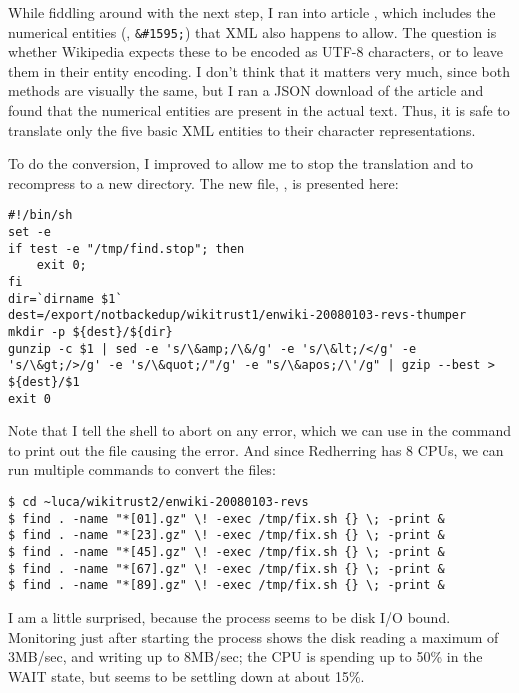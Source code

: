 While fiddling around with the next step, I ran into
article , which includes the numerical
entities (\eg, \texttt{\&\#1595;}) that XML also happens to allow.
The question is whether Wikipedia expects these to be
encoded as UTF-8 characters, or to leave them in their
entity encoding.
I don't think that it matters very much, since both methods
are visually the same, but I ran a JSON download of the
 article and found that the numerical entities
are present in the actual text.
Thus, it is safe to translate only the five basic XML entities
to their character representations.

To do the conversion, I improved  to allow
me to stop the translation and to recompress to a new directory.
The new file, , is presented here:
\begin{verbatim}
#!/bin/sh
set -e
if test -e "/tmp/find.stop"; then
    exit 0;
fi
dir=`dirname $1`
dest=/export/notbackedup/wikitrust1/enwiki-20080103-revs-thumper
mkdir -p ${dest}/${dir}
gunzip -c $1 | sed -e 's/\&amp;/\&/g' -e 's/\&lt;/</g' -e 's/\&gt;/>/g' -e 's/\&quot;/"/g' -e "s/\&apos;/\'/g" | gzip --best > ${dest}/$1
exit 0
\end{verbatim}
Note that I tell the shell to abort on any error, which we
can use in the  command to print out the file
causing the error.
And since Redherring has 8 CPUs, we can run multiple 
commands to convert the files:
\begin{verbatim}
$ cd ~luca/wikitrust2/enwiki-20080103-revs
$ find . -name "*[01].gz" \! -exec /tmp/fix.sh {} \; -print &
$ find . -name "*[23].gz" \! -exec /tmp/fix.sh {} \; -print &
$ find . -name "*[45].gz" \! -exec /tmp/fix.sh {} \; -print &
$ find . -name "*[67].gz" \! -exec /tmp/fix.sh {} \; -print &
$ find . -name "*[89].gz" \! -exec /tmp/fix.sh {} \; -print &
\end{verbatim}

I am a little surprised, because the process seems to be
disk I/O bound.
Monitoring just after starting the process shows the
disk reading a maximum of 3MB/sec, and writing up to 8MB/sec;
the CPU is spending up to 50\% in the WAIT state, but seems to be
settling down at about 15\%.

